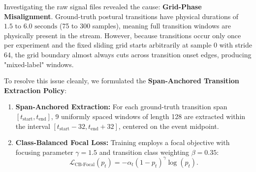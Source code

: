\documentclass[journal,onecolumn,10pt]{IEEEtran}
\theoremstyle{remark}
\begin{document}
Investigating the raw signal files revealed the cause: \textbf{Grid-Phase Misalignment}. Ground-truth postural transitions have physical durations of $1.5\text{ to }6.0\text{ seconds}$ (75 to 300 samples), meaning full transition windows are physically present in the stream. However, because transitions occur only once per experiment and the fixed sliding grid starts arbitrarily at sample 0 with stride 64, the grid boundary almost always cuts across transition onset edges, producing "mixed-label" windows.

To resolve this issue cleanly, we formulated the \textbf{Span-Anchored Transition Extraction Policy}:
\begin{enumerate}[leftmargin=1.4em]
  \item \textbf{Span-Anchored Extraction:} For each ground-truth transition span $[t_{\text{start}}, t_{\text{end}}]$, 9 uniformly spaced windows of length 128 are extracted within the interval $[t_{\text{start}} - 32, t_{\text{end}} + 32]$, centered on the event midpoint.
  \item \textbf{Class-Balanced Focal Loss:} Training employs a focal objective with focusing parameter $\gamma = 1.5$ and transition class weighting $\beta = 0.35$:
  \begin{equation}
  \mathcal{L}_{\text{CB-Focal}}(p_t) = -\alpha_t (1 - p_t)^\gamma \log(p_t).
  \end{equation}
\end{enumerate}

\begin{table}[!htbp]
\centering\small
\caption{Gate G2 Support Audit and Multi-Seed Performance ($K=12$ SmallCNN1D).}
\label{tab:g2_closure}
\end{table}
\end{document}
